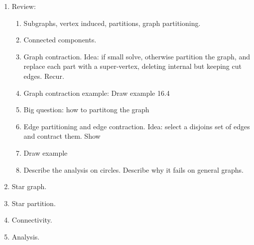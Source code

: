 \begin{notesonly}
\begin{enumerate}
\item Review:

\begin{enumerate}
\item Subgraphs, vertex induced, partitions, graph partitioning.
\item Connected components.
\item Graph contraction.  Idea: if small solve, otherwise partition
  the graph, and replace each part with a super-vertex, deleting
  internal but keeping cut edges.  Recur.

\item Graph contraction example: Draw example 16.4
\item Big question: how to partitong the graph
\item Edge partitioning and edge contraction. Idea: select a disjoins
  set of edges and contract them. Show
\item Draw example 
\item Describe the analysis on circles.  Describe why it fails on
  general graphs.
\end{enumerate}

\item Star graph.
\item Star partition.
\item Connectivity.
\item Analysis.

\end{enumerate}


\end{notesonly}

